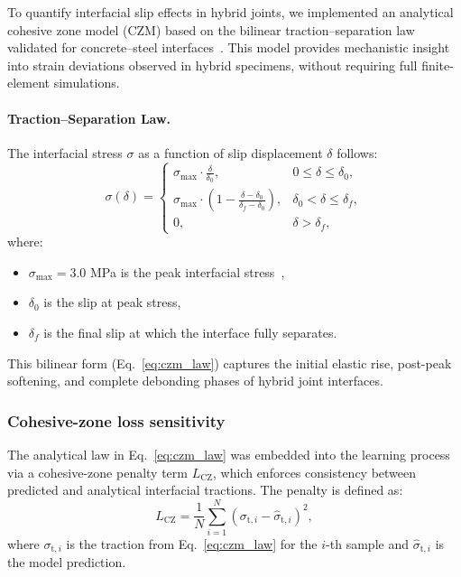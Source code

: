\documentclass{article}
\begin{document}
To quantify interfacial slip effects in hybrid joints, we implemented an analytical cohesive zone model (CZM)
based on the bilinear traction–separation law validated for concrete–steel interfaces~\cite{Xu2025UHPC}.
This model provides mechanistic insight into strain deviations observed in hybrid specimens,
without requiring full finite-element simulations.

\paragraph{Traction–Separation Law.}
The interfacial stress $\sigma$ as a function of slip displacement $\delta$ follows:
\begin{equation}
\sigma(\delta) =
\begin{cases}
\sigma_{\max} \cdot \frac{\delta}{\delta_0}, & 0 \le \delta \le \delta_0, \\
\sigma_{\max} \cdot \left( 1 - \frac{\delta - \delta_0}{\delta_f - \delta_0} \right), & \delta_0 < \delta \le \delta_f, \\
0, & \delta > \delta_f,
\end{cases}
\label{eq:czm_law}
\end{equation}
where:
\begin{itemize}
    \item $\sigma_{\max} = 3.0$ MPa is the peak interfacial stress~\cite{Xu2025UHPC},
    \item $\delta_0$ is the slip at peak stress,
    \item $\delta_f$ is the final slip at which the interface fully separates.
\end{itemize}
This bilinear form (Eq.~\ref{eq:czm_law}) captures the initial elastic rise, post-peak softening, and complete debonding phases of hybrid joint interfaces.

\subsubsection{Cohesive-zone loss sensitivity}
\label{subsec:cz_sensitivity_method}

The analytical law in Eq.~\ref{eq:czm_law} was embedded into the learning process via a cohesive-zone penalty term $L_{\mathrm{CZ}}$, which enforces consistency between predicted and analytical interfacial tractions.
The penalty is defined as:
\begin{equation}
    L_{\mathrm{CZ}} = \frac{1}{N} \sum_{i=1}^N \left( \sigma_{\mathrm{t},i} - \hat{\sigma}_{\mathrm{t},i} \right)^2,
    \label{eq:cz_loss_term}
\end{equation}
where $\sigma_{\mathrm{t},i}$ is the traction from Eq.~\ref{eq:czm_law} for the $i$-th sample and $\hat{\sigma}_{\mathrm{t},i}$ is the model prediction.
\end{document}

